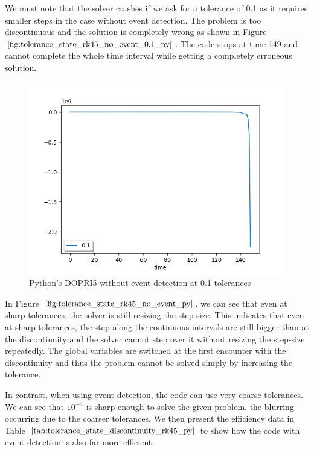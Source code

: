 We must note that the solver crashes if we ask for a tolerance of 0.1 as it requires smaller steps in the case without event detection. The problem is too discontinuous and the solution is completely wrong as shown in Figure $\ref{fig:tolerance_state_rk45_no_event_0.1_py}$. The code stops at time 149 and cannot complete the whole time interval while getting a completely erroneous solution.

\begin{figure}[h]
	\centering
	\includegraphics[width=0.7\linewidth]{./figures/tolerance_state_rk45_no_event_0.1_py}
	\caption{Python's DOPRI5 without event detection at 0.1 tolerances}
	\label{fig:tolerance_state_rk45_no_event_0.1_py}
\end{figure}

In Figure $\ref{fig:tolerance_state_rk45_no_event_py}$, we can see that even at sharp tolerances, the solver is still resizing the step-size. This indicates that even at sharp tolerances, the step along the continuous intervals are still bigger than at the discontinuity and the solver cannot step over it without resizing the step-size repeatedly. The global variables are switched at the first encounter with the discontinuity and thus the problem cannot be solved simply by increasing the tolerance.

In contrast, when using event detection, the code can use very coarse tolerances. We can see that $10^{-4}$ is sharp enough to solve the given problem, the blurring occurring due to the coarser tolerances. We then present the efficiency data in Table $\ref{tab:tolerance_state_discontinuity_rk45_py}$ to show how the code with event detection is also far more efficient.

